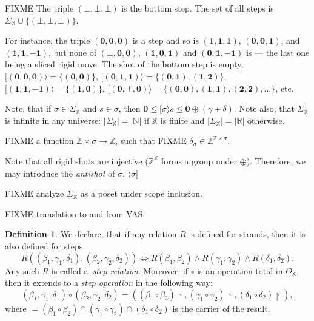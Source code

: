 \documentclass [a4paper,12pt] {article}
\theoremstyle{definition}
\newtheorem{definition}{Definition}[section]
\newcommand{\domain}{}
\DeclareRobustCommand{\domain}{\mathop{\textstyle\mathsmaller{\bf {Dom}}}}
\newcommand{\carrier}{}
\DeclareRobustCommand{\carrier}{\mathop{\textstyle\mathsmaller{\bf {Car}}}}
\newcommand{\scope}{}
\DeclareRobustCommand{\scope}{\mathop{\textstyle\mathsmaller{\bf {Sco}}}}
\begin{document}
FIXME The triple $(\bm{\bot}, \bm{\bot}, \bm{\bot})$ is the bottom
step.  The set of all steps is $\Sigma_{\mathbb X} \cup \{(\bm{\bot},
\bm{\bot}, \bm{\bot})\}$.

For instance, the triple $(\bm{0}, \bm{0}, \bm{0})$ is a step and so
is $(\bm{1}, \bm{1}, \bm{1})$, $(\bm{0}, \bm{0}, \bm{1})$, and
$(\bm{1}, \bm{1}, \bm{-1})$, but none of $(\bm{\bot}, \bm{0},
\bm{0})$, $(\bm{1}, \bm{0}, \bm{1})$ and $(\bm{0}, \bm{1}, \bm{-1})$
is --- the last one being a sliced rigid move.  The shot of the bottom
step is empty, $[(\bm{0}, \bm{0}, \bm{0})\rangle = \{(\bm{0},
  \bm{0})\}$, $[(\bm{0}, \bm{1}, \bm{1})\rangle = \{(\bm{0}, \bm{1}),
    (\bm{1}, \bm{2})\}$, $[(\bm{1}, \bm{1}, \bm{-1})\rangle =
      \{(\bm{1}, \bm{0})\}$, $[(\bm{0}, \bm{\top}, \bm{0})\rangle =
        \{(\bm{0}, \bm{0}), (\bm{1}, \bm{1}), (\bm{2}, \bm{2}),
        \ldots\}$, etc.

Note, that if $\sigma \in \Sigma_{\mathbb X}$ and $s \in
\scope{\sigma}$, then $\bm{0} \leq [{\sigma\rangle}s \leq \bm{0}
  \oplus (\gamma + \delta)$.  Note also, that $\Sigma_{\mathbb X}$ is
  infinite in any universe: $|\Sigma_{\mathbb X}| = |{\mathbb N}|$ if
  ${\mathbb X}$ is finite and $|\Sigma_{\mathbb X}| = |{\mathbb R}|$
  otherwise.

FIXME a function ${\mathbb Z} \times \carrier{\sigma} \rightarrow
{\mathbb Z}$, such that FIXME $\delta_\sigma \in {\mathbb Z}^{{\mathbb
    Z} \times \carrier{\sigma}}$.

Note that all rigid shots are injective (${\mathbb Z}^{\mathbb X}$
forms a group under $\oplus$).  Therefore, we may introduce the {\em
  antishot}\/ of $\sigma$, $\langle\sigma]$

FIXME analyze $\Sigma_{\mathbb X}$ as a poset under scope inclusion.

FIXME translation to and from VAS.

\begin {definition}\label{def-step-operation}
  We declare, that if any relation $R$ is defined for strands, then it
  is also defined for steps,
  \[R((\beta_1, \gamma_1, \delta_1), (\beta_2, \gamma_2, \delta_2)) \iff
  R(\beta_1, \beta_2) \wedge R(\gamma_1, \gamma_2) \wedge R(\delta_1, \delta_2).\]
  Any such $R$ is called a~{\em step relation}\/.  Moreover, if
  $\circ$ is an operation total in $\Theta_{\mathbb X}$, then it
  extends to a {\em step operation}\/ in the following way:
  \[(\beta_1, \gamma_1, \delta_1) \circ (\beta_2, \gamma_2, \delta_2) =
  ((\beta_1 \circ \beta_2){\restriction}_{\carrier}, (\gamma_1 \circ
  \gamma_2){\restriction}_{\carrier}, (\delta_1 \circ
  \delta_2){\restriction}_{\carrier}),\]
  where $\carrier = \domain{(\beta_1 \circ \beta_2)} \cap
  \domain{(\gamma_1 \circ \gamma_2)} \cap \domain{(\delta_1 \circ
    \delta_2)}$ is the carrier of the result.
\end {definition}
\end{document}
